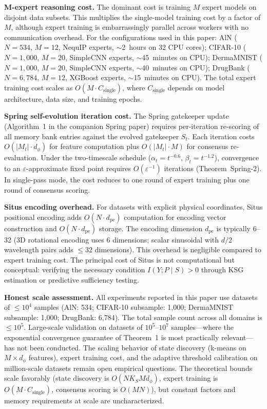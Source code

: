 \textbf{M-expert reasoning cost.} The dominant cost is training $M$ expert models on disjoint data subsets. This multiplies the single-model training cost by a factor of $M$, although expert training is embarrassingly parallel across workers with no communication overhead. For the configurations used in this paper: AlN ($N=534$, $M=12$, NequIP experts, $\sim$2~hours on 32 CPU cores); CIFAR-10 ($N=1{,}000$, $M=20$, SimpleCNN experts, $\sim$45~minutes on CPU); DermaMNIST ($N=1{,}000$, $M=20$, SimpleCNN experts, $\sim$40~minutes on CPU); DrugBank ($N=6{,}784$, $M=12$, XGBoost experts, $\sim$15~minutes on CPU). The total expert training cost scales as $O(M \cdot C_{\text{single}})$, where $C_{\text{single}}$ depends on model architecture, data size, and training epochs.

\textbf{Spring self-evolution iteration cost.} The Spring gatekeeper update (Algorithm~1 in the companion Spring paper) requires per-iteration re-scoring of all memory bank entries against the evolved gatekeeper $S_t$. Each iteration costs $O(|M_t| \cdot d_\phi)$ for feature computation plus $O(|M_t| \cdot M)$ for consensus re-evaluation. Under the two-timescale schedule ($\alpha_t = t^{-0.6}$, $\beta_t = t^{-1.2}$), convergence to an $\varepsilon$-approximate fixed point requires $O(\varepsilon^{-1})$ iterations (Theorem~Spring-2). In single-pass mode, the cost reduces to one round of expert training plus one round of consensus scoring.

\textbf{Situs encoding overhead.} For datasets with explicit physical coordinates, Situs positional encoding adds $O(N \cdot d_{\text{pe}})$ computation for encoding vector construction and $O(N \cdot d_{\text{pe}})$ storage. The encoding dimension $d_{\text{pe}}$ is typically 6--32 (3D rotational encoding uses 6 dimensions; scalar sinusoidal with $d/2$ wavelength pairs adds $\leq 32$ dimensions). This overhead is negligible compared to expert training cost. The principal cost of Situs is not computational but conceptual: verifying the necessary condition $I(Y; P \mid S) > 0$ through KSG estimation or predictive sufficiency testing.

\textbf{Honest scale assessment.} All experiments reported in this paper use datasets of $\leq 10^4$ samples (AlN: 534; CIFAR-10 subsample: 1,000; DermaMNIST subsample: 1,000; DrugBank: 6,784). The total sample count across all domains is $\leq 10^5$. Large-scale validation on datasets of $10^5$--$10^7$ samples---where the exponential convergence guarantee of Theorem~1 is most practically relevant---has not been conducted. The scaling behavior of state discovery (k-means on $M \times d_\phi$ features), expert training cost, and the adaptive threshold calibration on million-scale datasets remain open empirical questions. The theoretical bounds scale favorably (state discovery is $O(N K_S M d_\phi)$, expert training is $O(M \cdot C_{\text{single}})$, consensus scoring is $O(MN)$), but constant factors and memory requirements at scale are uncharacterized.

